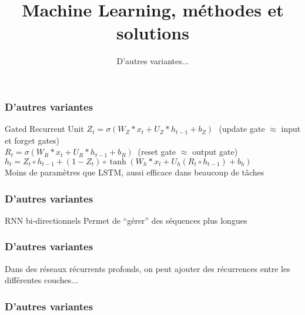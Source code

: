 \documentclass{formation}
\title{Machine Learning, méthodes et solutions}
\subtitle{D'autres variantes...}
\begin{document}
\maketitle

\begin{frame}
  \frametitle{D'autres variantes}
  Gated Recurrent Unit
  $Z_{t}=\sigma (W_{Z}*x_{t}+U_{Z}*h_{t-1}+b_{Z})\,\,\,\,$(update gate $\approx$ input et forget gates) \\
  $R_{t}=\sigma (W_{R}*x_{t}+U_{R}*h_{t-1}+b_{R})\;\;$(reset gate $\approx$ output gate) \\
  $h_{t}=Z_{t}\circ h_{t-1}+(1-Z_{t})\circ \tanh(W_{h}*x_{t}+U_{h}(R_{t}\circ h_{t-1})+b_{h})$ \\
  Moins de paramètres que LSTM, aussi efficace dans beaucoup de tâches
\end{frame}

\begin{frame}
  \frametitle{D'autres variantes}
  RNN bi-directionnels
  Permet de ``gérer'' des séquences plus longues
\end{frame}

\begin{frame}
  \frametitle{D'autres variantes}
  Dans des réseaux récurrents profonds, on peut ajouter des récurrences entre les différentes couches... \\
\end{frame}

\begin{frame}
  \frametitle{D'autres variantes}
\end{frame}
\end{document}
